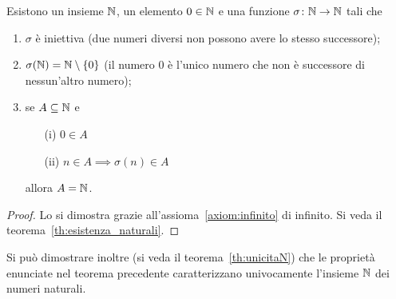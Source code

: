 \begin{theorem}
  \label{th:assiomi_peano}%
    \label{def:naturali}%
  \index{$\NN$}%
Esistono un insieme $\NN$, 
un elemento $0\in {\mathbb N}$ 
e una funzione $\sigma\colon {\mathbb N}\to{\mathbb N}$ tali che
\begin{enumerate}
  \item $\sigma$ è iniettiva (due numeri diversi non possono avere lo stesso 
  successore);
  \item $\sigma({\mathbb N}) = {\mathbb N} \setminus{\left\{ 0 \right\}}$ 
  (il numero $0$ è l'unico numero che non è successore di nessun'altro numero);
  \item se $A\subseteq {\mathbb N}$ e 
  \begin{enumerate} 
    \item[(i)] $0\in A$ 
    \item[(ii)] $n\in A \implies \sigma(n)\in A$
  \end{enumerate}
  allora $A={\mathbb N}$.
\end{enumerate}
\end{theorem}
%
\begin{proof}
  Lo si dimostra grazie all'assioma~\ref{axiom:infinito} di infinito.
  Si veda il teorema~\ref{th:esistenza_naturali}.
\end{proof}

Si può dimostrare inoltre (si veda il teorema~\ref{th:unicitaN}) che le proprietà 
enunciate nel teorema precedente caratterizzano univocamente l'insieme 
$\NN$ dei numeri naturali.

